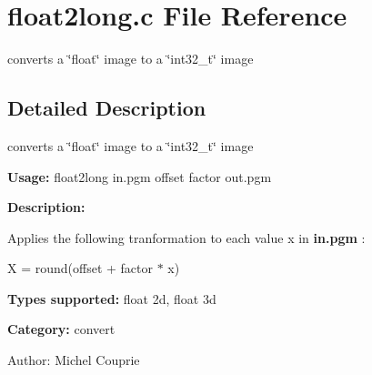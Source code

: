 \section{float2long.c File Reference}
\label{float2long_8c}
converts a \char`\"{}float\char`\"{} image to a \char`\"{}int32\_\-t\char`\"{} image 



\subsection{Detailed Description}
converts a \char`\"{}float\char`\"{} image to a \char`\"{}int32\_\-t\char`\"{} image 

{\bf Usage:} float2long in.pgm offset factor out.pgm

{\bf Description:}

Applies the following tranformation to each value x in {\bf in.pgm} :

X = round(offset + factor $\ast$ x)

{\bf Types supported:} float 2d, float 3d

{\bf Category:} convert

\begin{Desc}
\item[Author:]Michel Couprie \end{Desc}

